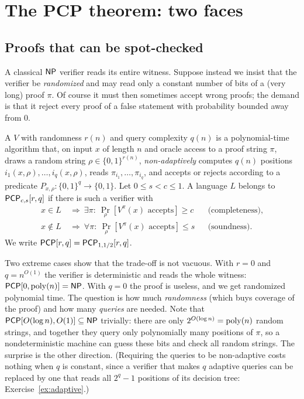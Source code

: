 \section{The PCP theorem: two faces}
\label{sec:pcp}

\subsection{Proofs that can be spot-checked}

A classical $\mathsf{NP}$ verifier reads its entire witness.  Suppose instead we insist that the
verifier be \emph{randomized} and may read only a constant number of bits of a (very long)
proof $\pi$.  Of course it must then sometimes accept wrong proofs; the demand is that it
reject every proof of a false statement with probability bounded away from $0$.

\begin{definition}\label{def:pcp}
A  $V$ with randomness $r(n)$ and query complexity $q(n)$ is a
polynomial-time algorithm that, on input $x$ of length $n$ and oracle access to a proof string
$\pi$, draws a random string $\rho\in\{0,1\}^{r(n)}$, \emph{non-adaptively} computes $q(n)$
positions $i_1(x,\rho),\dots,i_q(x,\rho)$, reads $\pi_{i_1},\dots,\pi_{i_q}$, and accepts or rejects
according to a predicate $P_{x,\rho}\colon\{0,1\}^q\to\{0,1\}$.
Let $0\le s<c\le1$.  A language $L$ belongs to $\mathsf{PCP}_{c,s}[r,q]$ if there is such a
verifier with
\begin{align*}
  x\in L &\ \Longrightarrow\ \exists\pi:\ \Pr_\rho[V^\pi(x)\text{ accepts}]\ge c &&\text{(completeness)},\\
  x\notin L &\ \Longrightarrow\ \forall\pi:\ \Pr_\rho[V^\pi(x)\text{ accepts}]\le s &&\text{(soundness)}.
\end{align*}
We write $\mathsf{PCP}[r,q]=\mathsf{PCP}_{1,1/2}[r,q]$.
\end{definition}

Two extreme cases show that the trade-off is not vacuous.  With $r=0$ and $q=n^{O(1)}$ the verifier
is deterministic and reads the whole witness: $\mathsf{PCP}[0,\operatorname{poly}(n)]=\mathsf{NP}$.  With $q=0$ the proof is
useless, and we get randomized polynomial time.  The question is how much \emph{randomness}
(which buys coverage of the proof) and how many \emph{queries} are needed.  Note that
$\mathsf{PCP}[O(\log n),O(1)]\subseteq\mathsf{NP}$ trivially: there are only $2^{O(\log n)}=\operatorname{poly}(n)$ random
strings, and together they query only polynomially many positions of $\pi$, so a nondeterministic
machine can guess these bits and check all random strings.  The surprise is the other direction.  (Requiring the queries to be non-adaptive costs nothing when $q$ is constant, since a verifier that makes $q$ adaptive queries can be replaced by one that reads all $2^q-1$ positions of its decision tree: Exercise~\ref{ex:adaptive}.)

